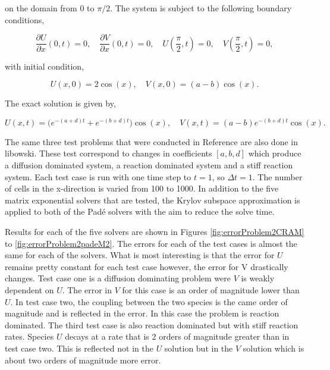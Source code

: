\noindent on the domain from $0$ to $\pi/2$. The system is subject to the following boundary conditions, 

\begin{equation}
    \frac{\partial U}{\partial x}(0,t) = 0, \quad \frac{\partial V}{\partial x}(0,t) = 0, \quad U(\frac{\pi}{2}, t) = 0, \quad V(\frac{\pi}{2}, t)= 0,
\end{equation}

\noindent with initial condition,

\begin{equation}
    U(x,0) = 2\cos(x), \quad V(x,0) = (a-b)\cos(x).
\end{equation}

\noindent The exact solution is given by,

\begin{equation}
    U(x,t) = \bigg( e^{-(a+d)t} + e^{-(b+d)t}\bigg)\cos(x), \quad V(x,t) = (a - b) e^{-(b+d)t}\cos(x).
\end{equation}

The same three test problems that were conducted in Reference \cite{ching2007} are also done in libowski. These test correspond to changes in coefficients $[a, b, d]$ which produce a diffusion dominated system, a reaction dominated system and a stiff reaction system. Each test case is run with one time step to $t = 1$, so $\Delta t = 1$. The number of cells in the x-direction is varied from 100 to 1000. In addition to the five matrix exponential solvers that are tested, the Krylov subspace approximation is applied to both of the Pad\'e solvers with the aim to reduce the solve time. 

Results for each of the five solvers are shown in Figures \ref{fig:errorProblem2CRAM} to \ref{fig:errorProblem2padeM2}. The errors for each of the test cases is almost the same for each of the solvers. What is most interesting is that the error for $U$ remains pretty constant for each test case however, the error for V drastically changes. Test case one is a diffusion dominating problem were $V$ is weakly dependent on $U$. The error in $V$ for this case is an order of magnitude lower than $U$. In test case two, the coupling between the two species is the came order of magnitude and is reflected in the error. In this case the problem is reaction dominated. The third test case is also reaction dominated but with stiff reaction rates. Species $U$ decays at a rate that is 2 orders of magnitude greater than in test case two. This is reflected not in the $U$ solution but in the $V$ solution which is about two orders of magnitude more error. 

